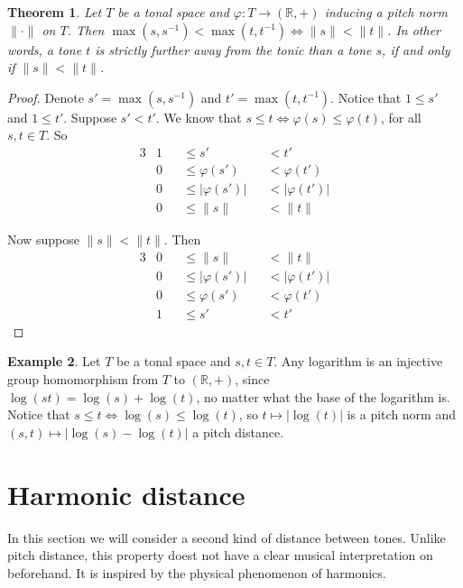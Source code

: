 \documentclass[a4paper]{book}
\newtheorem{theorem}{Theorem}[chapter]
\theoremstyle{definition}
\newtheorem{example}[theorem]{Example}
\begin{document}
\begin{theorem}
    \label{order_preserving_homomorphism}
    Let $T$ be a tonal space and $\varphi : T \to (\mathbb{R},+)$ inducing a pitch norm $\| \cdot \|$ on $T$.
    Then $ \max(s,s^{-1}) < \max(t,t^{-1}) \Leftrightarrow \|s\|<\|t\|$.
    In other words, a tone $t$ is strictly further away from the tonic than a tone $s$, if and only if $\|s\| < \|t\|$.
\end{theorem}
\begin{proof}
    Denote $s' = \max(s,s^{-1})$ and $t' = \max(t,t^{-1})$.
    Notice that $1 \leq s'$ and $1 \leq t'$.
    Suppose $s' < t'$.
    We know that $s \leq t \Leftrightarrow \varphi(s) \leq \varphi(t)$, for all $s,t \in T$.
    So 
    \begin{alignat*}{3}
        & 1 & &\leq s'             & &<  t' \\
        & 0 & &\leq \varphi(s')    & &<  \varphi(t') \\
        & 0 & &\leq |\varphi(s')|  & &<  |\varphi(t')| \\
        & 0 & &\leq \|s\|          & &<  \|t\|
    \end{alignat*}
    
    Now suppose $\|s\|<\|t\|$.
    Then 
    \begin{alignat*}{3}
        & 0 & &\leq \|s\|          & &<  \|t\| \\
        & 0 & &\leq |\varphi(s')|  & &<  |\varphi(t')| \\
        & 0 & &\leq \varphi(s')    & &<  \varphi(t') \\
        & 1 & &\leq s'             & &<  t' 
    \end{alignat*}
\end{proof}

\begin{example}
    \label{log_as_melodic_distance}
    Let $T$ be a tonal space and $s,t \in T$.
    Any logarithm is an injective group homomorphism from $T$ to $(\mathbb{R},+)$, since $\log(st) = \log(s) + \log(t)$, no matter what the base of the logarithm is.
    Notice that $s \leq t \Leftrightarrow \log(s) \leq \log(t)$, so $t \mapsto |\log(t)|$ is a pitch norm and $(s,t) \mapsto |\log(s)-\log(t)|$ a pitch distance.
\end{example}

\section{Harmonic distance}
In this section we will consider a second kind of distance between tones.
Unlike pitch distance, this property doest not have a clear musical interpretation on beforehand.
It is inspired by the physical phenomenon of harmonics.
\end{document}
